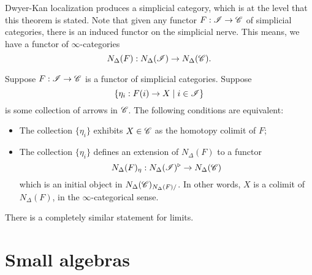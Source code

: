 \documentclass[11pt]{amsart}
\def\rcone{\triangleright}
\begin{document}
Dwyer-Kan localization produces a simplicial category, which is at the level that this theorem is stated. 
Note that given any functor $F : \mathscr I \to \mathscr C$ of simplicial categories, there is an induced functor on the simplicial nerve.
This means, we have a functor of $\infty$-categories
\[
N_{\Delta} (F) : N_{\Delta}(\mathscr I) \to N_{\Delta}(\mathscr C) .
\]

\begin{thm}
Suppose $F : \mathscr I \to \mathscr C$ is a functor of simplicial categories.
Suppose 
\[
\{\eta_i : F(i) \to X \; | \; i \in \mathscr I\}
\]
is some collection of arrows in $\mathscr C$. 
The following conditions are equivalent:
\begin{itemize}
\item 
The collection $\{\eta_i\}$ exhibits $X \in \mathscr C$ as the homotopy colimit of $F$;
\item 
The collection $\{\eta_i\}$ defines an extension of $N_{\Delta} (F)$ to a functor
\[
N_{\Delta} (F)_{\eta} : N_{\Delta}(\sI)^{\rcone} \to N_{\Delta}(\sC) 
\]
which is an initial object in $N_{\Delta}(\mathscr C)_{N_{\Delta}(F) / }$. 
In other words, $X$ is a colimit of $N_{\Delta}(F)$, in the $\infty$-categorical sense.
\end{itemize}
There is a completely similar statement for limits.
\end{thm}

\section{Small algebras}




 
\end{document}
